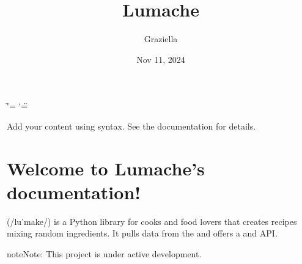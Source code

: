 \documentclass[letterpaper,10pt,english]{sphinxmanual}
\title{Lumache}
\date{Nov 11, 2024}
\author{Graziella}
\begin{document}
\ifdefined\shorthandoff
  \ifnum\catcode`\=\string=\active\shorthandoff{=}\fi
  \ifnum\catcode`\"=\active{}\fi
\fi

\pagestyle{empty}
\sphinxmaketitle
\pagestyle{plain}
\sphinxtableofcontents
\pagestyle{normal}
\label{\detokenize{index::doc}}


\sphinxAtStartPar
Add your content using  syntax. See the
documentation for details.


\chapter{Welcome to Lumache’s documentation!}
\label{\detokenize{index:welcome-to-lumache-s-documentation}}
\sphinxAtStartPar
{} (/lu’make/) is a Python library for cooks and food lovers that
creates recipes mixing random ingredients.  It pulls data from the  and offers a  and
 API.

\begin{sphinxadmonition}{note}{Note:}
\sphinxAtStartPar
This project is under active development.
\end{sphinxadmonition}



\renewcommand{\indexname}{Index}
\printindex
\end{document}
